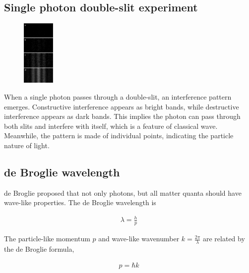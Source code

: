 \documentclass[12pt]{book} %
\numberwithin{equation}{chapter}
\def\l{\lambda}
\begin{document}
\subsection*{Single photon double-slit experiment}
\begin{figure}
\vspace{-0.5cm}
\centering
\includegraphics[width=0.14\textwidth]{Single photon double-slit}
\end{figure}
When a single photon passes through a double-slit, an interference pattern emerges. Constructive interference appears as bright bands, while destructive interference appears as dark bands. This implies the photon can pass through both slits and interfere with itself, which is a feature of classical wave.\bigskip\newline
Meanwhile, the pattern is made of individual points, indicating the particle nature of light.

\subsection*{de Broglie wavelength}
de Broglie proposed that not only photons, but all matter quanta should have wave-like properties. The de Broglie wavelength is
\begin{eqnbox}
\begin{align}
\lambda=\frac{h}{p}
\end{align}
\end{eqnbox}
The particle-like momentum $p$ and wave-like wavenumber $k=\frac{2\pi}{\l}$ are related by the de Broglie formula,
\begin{eqnbox}
\begin{align}
p=\hbar k
\end{align}
\end{eqnbox}
\end{document}
